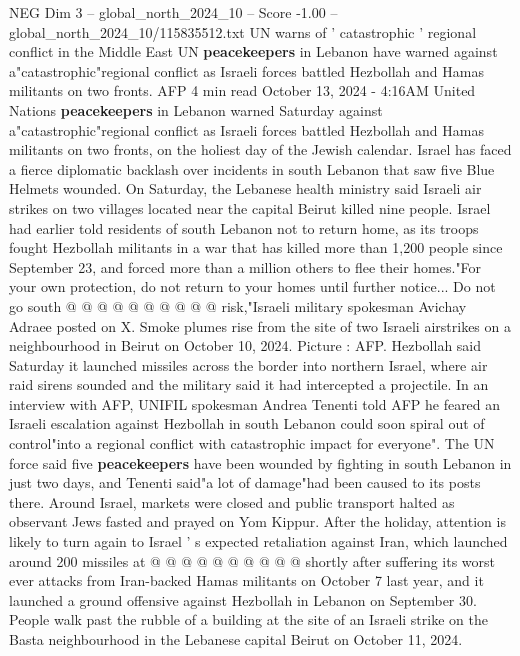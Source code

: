 \begin{textsample}{NEG Dim 3 – global\_north\_2024\_10 – Score -1.00 – global\_north\_2024\_10/115835512.txt}  \label{ex:f3_neg_308}
UN warns of ' catastrophic ' regional conflict in the Middle East UN \textbf{peacekeepers} in Lebanon have warned against a"catastrophic"regional conflict as Israeli forces battled Hezbollah and Hamas militants on two fronts.
AFP 4 min read October 13, 2024 - 4:16AM United Nations \textbf{peacekeepers} in Lebanon warned Saturday against a"catastrophic"regional conflict as Israeli forces battled Hezbollah and Hamas militants on two fronts, on the holiest day of the Jewish calendar.
Israel has faced a fierce diplomatic backlash over incidents in south Lebanon that saw five Blue Helmets wounded.
On Saturday, the Lebanese health ministry said Israeli air strikes on two villages located near the capital Beirut killed nine people.
Israel had earlier told residents of south Lebanon not to return home, as its troops fought Hezbollah militants in a war that has killed more than 1,200 people since September 23, and forced more than a million others to flee their homes."For your own protection, do not return to your homes until further notice...
Do not go south @ @ @ @ @ @ @ @ @ @ risk,"Israeli military spokesman Avichay Adraee posted on X.
Smoke plumes rise from the site of two Israeli airstrikes on a neighbourhood in Beirut on October 10, 2024.
Picture : AFP.
Hezbollah said Saturday it launched missiles across the border into northern Israel, where air raid sirens sounded and the military said it had intercepted a projectile.
In an interview with AFP, UNIFIL spokesman Andrea Tenenti told AFP he feared an Israeli escalation against Hezbollah in south Lebanon could soon spiral out of control"into a regional conflict with catastrophic impact for everyone".
The UN force said five \textbf{peacekeepers} have been wounded by fighting in south Lebanon in just two days, and Tenenti said"a lot of damage"had been caused to its posts there.
Around Israel, markets were closed and public transport halted as observant Jews fasted and prayed on Yom Kippur.
After the holiday, attention is likely to turn again to Israel ' s expected retaliation against Iran, which launched around 200 missiles at @ @ @ @ @ @ @ @ @ @ shortly after suffering its worst ever attacks from Iran-backed Hamas militants on October 7 last year, and it launched a ground offensive against Hezbollah in Lebanon on September 30.
People walk past the rubble of a building at the site of an Israeli strike on the Basta neighbourhood in the Lebanese capital Beirut on October 11, 2024.

\end{textsample}
